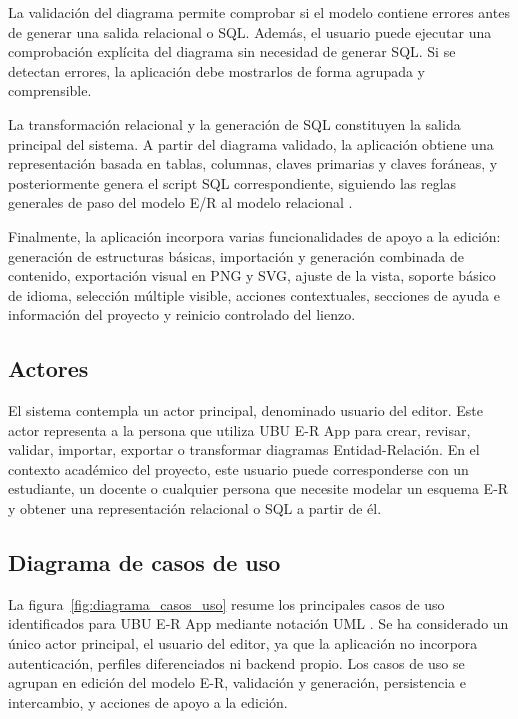 La validación del diagrama permite comprobar si el modelo contiene errores antes de generar una salida relacional o SQL. Además, el usuario puede ejecutar una comprobación explícita del diagrama sin necesidad de generar SQL. Si se detectan errores, la aplicación debe mostrarlos de forma agrupada y comprensible.

La transformación relacional y la generación de SQL constituyen la salida principal del sistema. A partir del diagrama validado, la aplicación obtiene una representación basada en tablas, columnas, claves primarias y claves foráneas, y posteriormente genera el script SQL correspondiente, siguiendo las reglas generales de paso del modelo E/R al modelo relacional \cite{tema6}.

Finalmente, la aplicación incorpora varias funcionalidades de apoyo a la edición: generación de estructuras básicas, importación y generación combinada de contenido, exportación visual en PNG y SVG, ajuste de la vista, soporte básico de idioma, selección múltiple visible, acciones contextuales, secciones de ayuda e información del proyecto y reinicio controlado del lienzo.

\subsection{Actores}

El sistema contempla un actor principal, denominado usuario del editor. Este actor representa a la persona que utiliza UBU E-R App para crear, revisar, validar, importar, exportar o transformar diagramas Entidad-Relación. En el contexto académico del proyecto, este usuario puede corresponderse con un estudiante, un docente o cualquier persona que necesite modelar un esquema E-R y obtener una representación relacional o SQL a partir de él.

\subsection{Diagrama de casos de uso}

La figura~\ref{fig:diagrama_casos_uso} resume los principales casos de uso identificados para UBU E-R App mediante notación UML \cite{omg-uml}. Se ha considerado un único actor principal, el usuario del editor, ya que la aplicación no incorpora autenticación, perfiles diferenciados ni backend propio. Los casos de uso se agrupan en edición del modelo E-R, validación y generación, persistencia e intercambio, y acciones de apoyo a la edición.

